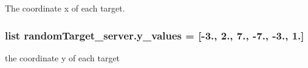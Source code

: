 The coordinate x of each target. 

\subsubsection[{\texorpdfstring{y\+\_\+values}{y_values}}]{\setlength{\rightskip}{0pt plus 5cm}list random\+Target\+\_\+server.\+y\+\_\+values = \mbox{[}-\/3., 2., 7., -\/7., -\/3., 1.\mbox{]}}\hypertarget{namespacerandom_target__server_a6021a8a552149867a092175e89321cb7}{}\label{namespacerandom_target__server_a6021a8a552149867a092175e89321cb7}


the coordinate y of each target 

